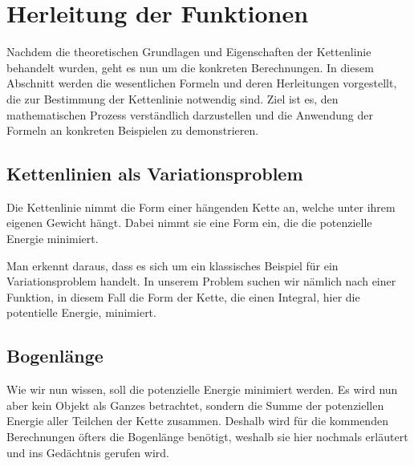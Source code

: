 %
%
%
%
\section{Herleitung der Funktionen\label{kettenlinie:section:Herleitung der Funktionen}}
Nachdem die theoretischen Grundlagen und Eigenschaften der Kettenlinie behandelt wurden, geht es nun um die konkreten Berechnungen.
In diesem Abschnitt werden die wesentlichen Formeln und deren Herleitungen vorgestellt, die zur Bestimmung der Kettenlinie notwendig sind.
Ziel ist es, den mathematischen Prozess verständlich darzustellen und die Anwendung der Formeln an konkreten Beispielen zu demonstrieren.

\subsection{Kettenlinien als Variationsproblem
\label{kettenlinie:subsection:Kettenlinien als Variationsproblem}}
Die Kettenlinie nimmt die Form einer hängenden Kette an, welche unter ihrem eigenen Gewicht hängt.
Dabei nimmt sie eine Form ein, die die potenzielle Energie minimiert.

Man erkennt daraus, dass es sich um ein klassisches Beispiel für ein Variationsproblem handelt.
In unserem Problem suchen wir nämlich nach einer Funktion, in diesem Fall die Form der Kette, die einen Integral, hier die potentielle Energie, minimiert.

\subsection{Bogenlänge
\label{kettenlinie:subsection:Bogenlänge}}
Wie wir nun wissen, soll die potenzielle Energie minimiert werden.
Es wird nun aber kein Objekt als Ganzes betrachtet, sondern die Summe der potenziellen Energie aller Teilchen der Kette zusammen.
Deshalb wird für die kommenden Berechnungen öfters die Bogenlänge benötigt, weshalb sie hier nochmals erläutert und ins Gedächtnis gerufen wird.

